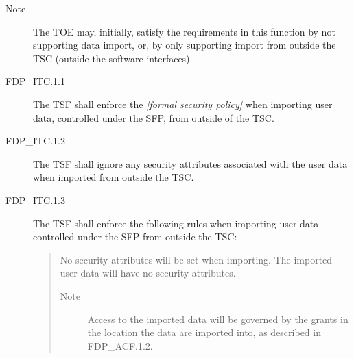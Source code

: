 \documentclass[12pt,english]{scrbook}
\begin{document}








\begin{description}
\item[Note]

The TOE may, initially, satisfy the requirements in this
function by not supporting data import, or, by only
supporting import from outside the TSC (outside the
software interfaces).

\item[FDP{\_}ITC.1.1]

The TSF shall enforce the \emph{{[}formal security policy]} when importing user 
data, controlled under the SFP, from outside of the TSC.

\item[FDP{\_}ITC.1.2]

The TSF shall ignore any security attributes associated with the user data 
when imported from outside the TSC.

\item[FDP{\_}ITC.1.3]

The TSF shall enforce the following rules when importing user data 
controlled under the SFP from outside the TSC:
\begin{quote}

No security attributes will be set when importing. The imported
user data will have no security attributes.
\begin{description}
\item[Note]

Access to the imported data will be governed by the grants in
the location the data are imported into, as described in
FDP{\_}ACF.1.2.

\end{description}
\end{quote}

\end{description}
\end{document}
